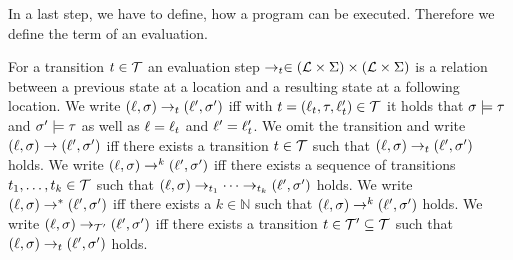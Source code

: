 In a last step, we have to define, how a program can be executed.
Therefore we define the term of an evaluation.

\begin{definition}[Evaluation] 
  For a transition $t \in \mathcal{T}$ an evaluation step $\rightarrow_t \in (\mathcal{L} \times \Sigma) \times (\mathcal{L} \times \Sigma)$ is a relation between a previous state at a location and a resulting state at a following location.
  We write $(\ell, \sigma) \rightarrow_t (\ell', \sigma')$ iff with $t = (\ell_t, \tau, \ell_t') \in \mathcal{T}$ it holds that $\sigma \models \tau$ and $\sigma' \models \tau$ as well as $\ell = \ell_t$ and $\ell' = \ell_t'$.
  We omit the transition and write $(\ell, \sigma) \rightarrow (\ell', \sigma')$ iff there exists a transition $t \in \mathcal{T}$ such that $(\ell, \sigma) \rightarrow_t (\ell', \sigma')$ holds.
  We write $(\ell, \sigma) \rightarrow^k (\ell', \sigma')$ iff there exists a sequence of transitions $t_1, \dots, t_k \in \mathcal{T}$ such that $(\ell, \sigma) \rightarrow_{t_1} \dots \rightarrow_{t_k} (\ell', \sigma')$ holds.
  We write $(\ell, \sigma) \rightarrow^* (\ell', \sigma')$ iff there exists a $k \in \mathbb{N}$ such that $(\ell, \sigma) \rightarrow^k (\ell', \sigma')$ holds.
  We write $(\ell, \sigma) \rightarrow_{\mathcal{T}'} (\ell', \sigma')$ iff there exists a transition $t \in \mathcal{T}' \subseteq \mathcal{T}$ such that $(\ell, \sigma) \rightarrow_t (\ell', \sigma')$ holds.
\end{definition}
